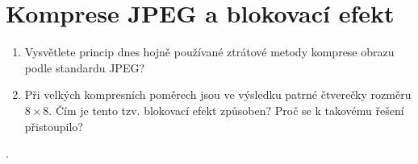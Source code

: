 \section{Komprese JPEG a blokovací efekt}
\begin{enumerate}
    \item Vysvětlete princip dnes hojně používané ztrátové metody komprese obrazu podle standardu JPEG? 
    \item Při velkých kompresních poměrech jsou ve výsledku patrné čtverečky rozměru $8 \times 8$. Čím je tento tzv. 
    blokovací efekt způsoben? Proč se k takovému řešení přistoupilo?
\end{enumerate}.